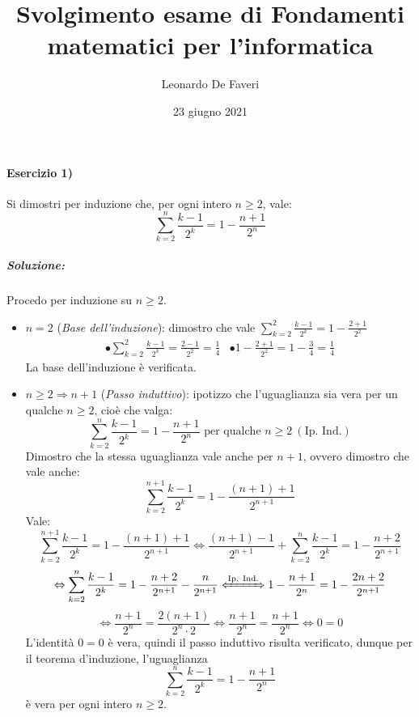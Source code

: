 \documentclass[12pt, a4paper]{report}
\title{Svolgimento esame di Fondamenti matematici per l'informatica}
\author{Leonardo De Faveri}
\date{23 giugno 2021}
\theoremstyle{definition}
\begin{document}
\maketitle
\paragraph{Esercizio 1)}
Si dimostri per induzione che, per ogni intero $n\geq2$, vale:
\[\sum_{k=2}^n\frac{k-1}{2^k}=1-\frac{n+1}{2^n}\]
\subparagraph{Soluzione:}
Procedo per induzione su $n\geq2$.
\begin{itemize}
    \item $n=2$ (\emph{Base dell'induzione}): dimostro che vale $\sum_{k=2}^2
    \frac{k-1}{2^k}=1-\frac{2+1}{2^2}$
    \setlength\arraycolsep{30pt}
    \[\begin{array}{cc}
        \bullet\sum_{k=2}^2\frac{k-1}{2^k}=\frac{2-1}{2^2}=\frac{1}{4}
        &\bullet 1-\frac{2+1}{2^2}=1-\frac{3}{4}=\frac{1}{4}
    \end{array}\]
    La base dell'induzione è verificata.
    \item $n\geq2\Rightarrow n+1$ (\emph{Passo induttivo}): ipotizzo che
    l'uguaglianza sia vera per un qualche $n\geq2$, cioè che valga:
    \[\sum_{k=2}^n\frac{k-1}{2^k}=1-\frac{n+1}{2^n}\text{ per qualche }n\geq2\
    (\text{Ip. Ind.})\]
    Dimostro che la stessa uguaglianza vale anche per $n+1$, ovvero dimostro che
    vale anche:
    \[\sum_{k=2}^{n+1}\frac{k-1}{2^k}=1-\frac{(n+1)+1}{2^{n+1}}\]
    Vale:
    \[\sum_{k=2}^{n+1}\frac{k-1}{2^k}=1-\frac{(n+1)+1}{2^{n+1}}\Leftrightarrow
    \frac{(n+1)-1}{2^{n+1}}+\sum_{k=2}^n\frac{k-1}{2^k}=1-\frac{n+2}{2^{n+1}}\]
    \[\Leftrightarrow\sum_{k=2}^n\frac{k-1}{2^k}=1-\frac{n+2}{2^{n+1}}-\frac{n}
    {2^{n+1}}\xLeftrightarrow{\text{Ip. Ind.}}1-\frac{n+1}{2^n}=1-\frac{2n+2}{2^{n+1}}\]
    \[\Leftrightarrow\frac{n+1}{2^n}=\frac{2(n+1)}{2^n\cdot2}\Leftrightarrow
    \frac{n+1}{2^n}=\frac{n+1}{2^n}\Leftrightarrow0=0\]
    L'identità $0=0$ è vera, quindi il passo induttivo risulta verificato, dunque
    per il teorema d'induzione, l'uguaglianza
    \[\sum_{k=2}^n\frac{k-1}{2^k}=1-\frac{n+1}{2^n}\]
    è vera per ogni intero $n\geq2$.
\end{itemize}

\newpage
\end{document}
